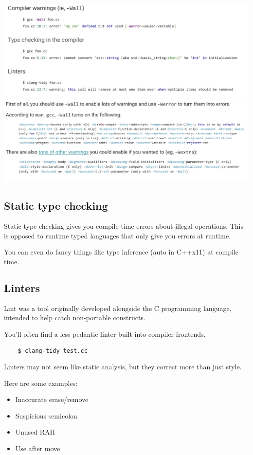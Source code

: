 \documentclass{article}
\begin{document}
\includegraphics*[width=\linewidth]{staticAnalysis.png}
\includegraphics*[width=\linewidth]{staticAnalysis2.png}

\subsection{Static type checking}

Static type checking gives you compile time errors about illegal operations. This is opposed to runtime typed languages that only give you errors at runtime.

You can even do fancy things like type inference (auto in C++x11) at compile time.

\subsection{Linters}

Lint was a tool originally developed alongside the C programming language,  intended to help catch non-portable constructs.

You'll often find a less pedantic linter built into compiler frontends.

\begin{verbatim}
    $ clang-tidy test.cc
\end{verbatim}

Linters may not seem like static analysis, but they correct more than just style.

Here are some examples:
\begin{itemize}
    \item Inaccurate erase/remove 
    \item Suspicious semicolon 
    \item Unused RAII 
    \item Use after move 
\end{itemize}
\end{document}

